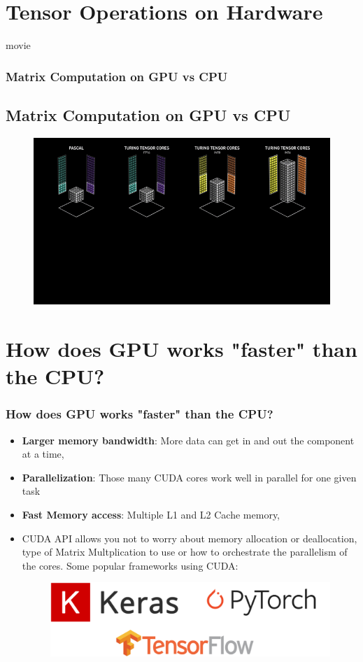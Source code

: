 \documentclass[11pt]{beamer}
\begin{document}
\section{Tensor Operations on Hardware}
\begin{frame}{movie}
	\frametitle{Matrix Computation on GPU vs CPU}
	\subsection{Matrix Computation on GPU vs CPU}
	\begin{figure}[h!]
	\centering
	{\includegraphics[width=1.0\textwidth]{gpugif.png}}
	\end{figure}
\end{frame}

\section{How does GPU works "faster" than the CPU?}
\begin{frame}
	\frametitle{How does GPU works "faster" than the CPU?}
	\begin{itemize}
		\item \textbf{Larger memory bandwidth}: More data can get in and out the component at a time,
		\item \textbf{Parallelization}: Those many CUDA cores work well in parallel for one given task
		\item \textbf{Fast Memory access}: Multiple L1 and L2 Cache memory,
		\item CUDA API allows you not to worry about memory allocation or deallocation, type of Matrix Multplication to use or how to orchestrate the parallelism of the cores. Some popular frameworks using CUDA:
			 \begin{figure}
			\includegraphics[width=\textwidth,height=\textheight,keepaspectratio]{dl_frameworks}
		\end{figure}
	\end{itemize}
\end{frame}
\end{document}

